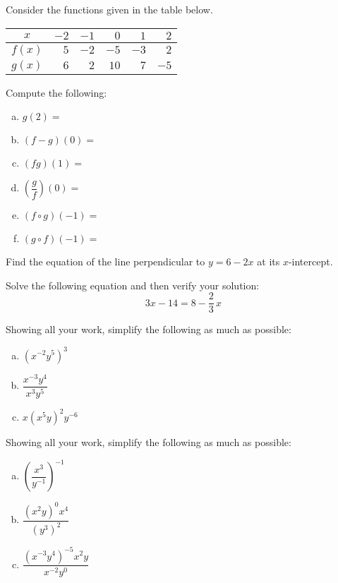 \documentclass[11pt,letterpaper]{article}
\begin{document}
\prob Consider the functions given in the table below.
        \begin{table}[H]
        \centering
        \begin{tabular}{| c || r | r | r | r | r |} \hline
	$x$ & $-2$ & $-1$ & $0$ & $1$ & $2$ \\ \hline
	$f(x)$ & $5$ & $-2$ & $-5$ & $-3$ & $2$ \\ \hline
	$g(x)$ & $6$ & $2$ & $10$ & $7$ & $-5$ \\ \hline
        \end{tabular}
        \end{table}

Compute the following: \pspace
        \begin{enumerate}[(a)]
        \item $g(2)=$ 
        \item $(f - g)(0)=$ 
        \item $(fg)(1)=$ 
        \item $\left( \dfrac{g}{f} \right)(0)=$ 
        \item $(f \circ g)(-1)=$ 
        \item $(g \circ f)(-1)=$ 
        \end{enumerate} \pspace


\prob Find the equation of the line perpendicular to $y= 6 - 2x$ at its $x$-intercept. \pspace


\prob Solve the following equation and then verify your solution:
	\[
	3x -14= 8 - \frac{2}{3}\,x
	\] \pspace


\prob Showing all your work, simplify the following as much as possible:
        \begin{enumerate}[(a)]
        \item $(x^{-2} y^5)^3$
        \item $\dfrac{x^{-3}y^4}{x^3y^5}$
        \item $x(x^5y)^2y^{-6}$
        \end{enumerate} \pspace


\prob Showing all your work, simplify the following as much as possible:
        \begin{enumerate}[(a)]
        \item $\left( \dfrac{x^3}{y^{-1}} \right)^{-1}$
        \item $\dfrac{(x^2y)^0 x^4}{(y^3)^2}$
        \item $\dfrac{(x^{-3} y^4)^{-5} x^2y}{x^{-2} y^0}$
        \end{enumerate} \pspace
\end{document}
